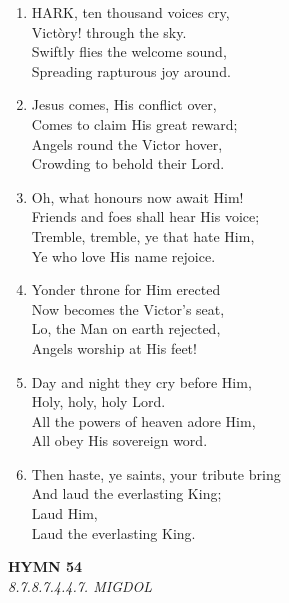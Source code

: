 \begin{enumerate}
    \item HARK, ten thousand voices cry, \\
        Vict\`ory! through the sky. \\
        Swiftly flies the welcome sound, \\
        Spreading rapturous joy around.

    \item Jesus comes, His conflict over, \\
        Comes to claim His great reward; \\
        Angels round the Victor hover, \\
        Crowding to behold their Lord.

    \item Oh, what honours now await Him! \\
        Friends and foes shall hear His voice; \\
        Tremble, tremble, ye that hate Him, \\
        Ye who love His name rejoice.

    \item Yonder throne for Him erected \\
        Now becomes the Victor's seat, \\
        Lo, the Man on earth rejected, \\
        Angels worship at His feet!

    \item Day and night they cry before Him, \\
        Holy, holy, holy Lord. \\
        All the powers of heaven adore Him, \\
        All obey His sovereign word.

    \item Then haste, ye saints, your tribute bring \\
        And laud the everlasting King; \\
        Laud Him, \\
        Laud the everlasting King.

\end{enumerate}

\newpage
\begin{center}
    {\Large \textbf{HYMN 54}}
    \\
    \textit{8.7.8.7.4.4.7. MIGDOL}
\end{center}
\vspace{1em}

